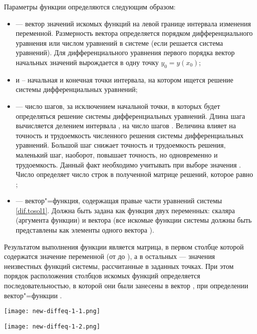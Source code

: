 Параметры функции  определяются следующим образом:
\begin{itemize}[label={}]
	\item {} --- вектор значений искомых функций на левой границе интервала изменения переменной. Размерность вектора определяется порядком дифференциального уравнения или числом уравнений в системе (если решается система уравнений). Для дифференциального уравнения первого порядка вектор начальных значений вырождается в одну точку $y_0 = y(x_0)$;
	\item {} и  – начальная и конечная точки интервала, на котором ищется решение системы дифференциальных уравнений;
	\item {} --- число шагов, за исключением начальной точки, в которых будет определяться решение системы дифференциальных уравнений. Длина шага вычисляется делением интервала , на число шагов . Величина  влияет на точность и трудоемкость численного решения системы дифференциальных уравнений. Большой шаг снижает точность и трудоемкость решения, маленький шаг, наоборот, повышает точность, но одновременно и трудоемкость. Данный факт необходимо учитывать при выборе значения . Число  определяет число строк в полученной матрице решений, которое равно ;
	\item {} --- вектор"=функция, содержащая правые части уравнений системы \ref{dif.tosol1}. Должна быть задана как функция двух переменных: скаляра  (аргумента функции) и вектора  (все искомые функции системы должны быть представлены как элементы одного вектора ).
\end{itemize}

Результатом выполнения функции  является матрица, в первом столбце которой содержатся  значение переменной  (от  до ), а в остальных --- значения неизвестных функций системы, рассчитанные в заданных точках. При этом порядок расположения столбцов искомых функций определяется последовательностью, в которой они были занесены в вектор , при определении вектор"=функции .


\begin{center}
	\texttt{[image: new-diffeq-1-1.png]}
\end{center}
\begin{center}
	\texttt{[image: new-diffeq-1-2.png]}
\end{center}

